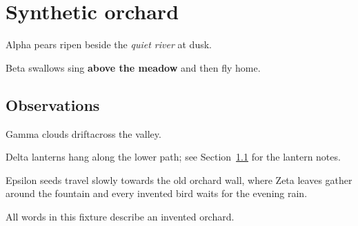 \documentclass[a5paper,11pt]{article}
\begin{document}
\section{Synthetic orchard}\label{sec:orchard}

Alpha pears ripen beside the \emph{quiet river} at dusk.
\vspace{1em}

Beta swallows sing \textbf{above the meadow} and then fly home.

\subsection{Observations}\label{sec:obs}

Gamma clouds drift\hspace{2mm}across the valley.

Delta lanterns hang along the lower path; see Section~\ref{sec:obs} for the lantern notes.

Epsilon seeds travel slowly towards the old orchard wall, where Zeta leaves gather around the fountain and every invented bird waits for the evening rain.

All words in this fixture describe an invented orchard.
\end{document}
